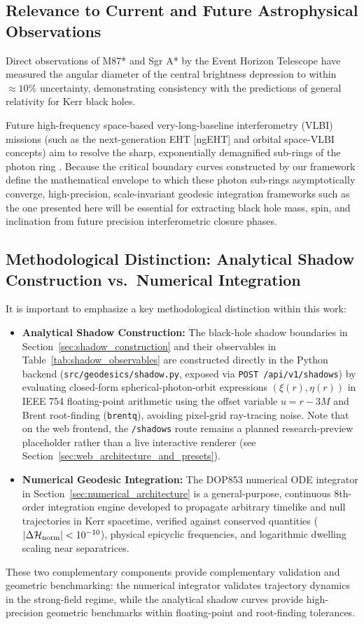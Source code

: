 \subsection{Relevance to Current and Future Astrophysical Observations}
Direct observations of M87* \cite{EHT2019_PaperI} and Sgr A* \cite{EHT2022_PaperI} by the Event Horizon Telescope have measured the angular diameter of the central brightness depression to within $\approx 10\%$ uncertainty, demonstrating consistency with the predictions of general relativity for Kerr black holes.

Future high-frequency space-based very-long-baseline interferometry (VLBI) missions (such as the next-generation EHT [ngEHT] and orbital space-VLBI concepts) aim to resolve the sharp, exponentially demagnified sub-rings of the photon ring \cite{Johnson2020,Chael2021,Gralla2020}. Because the critical boundary curves constructed by our framework define the mathematical envelope to which these photon sub-rings asymptotically converge, high-precision, scale-invariant geodesic integration frameworks such as the one presented here will be essential for extracting black hole mass, spin, and inclination from future precision interferometric closure phases.

\subsection{Methodological Distinction: Analytical Shadow Construction vs.\ Numerical Integration}
It is important to emphasize a key methodological distinction within this work:
\begin{itemize}
    \item \textbf{Analytical Shadow Construction:} The black-hole shadow boundaries in Section~\ref{sec:shadow_construction} and their observables in Table~\ref{tab:shadow_observables} are constructed directly in the Python backend (\texttt{src/\allowbreak geodesics/\allowbreak shadow.py}, exposed via \texttt{POST /api/\allowbreak v1/\allowbreak shadows}) by evaluating closed-form spherical-photon-orbit expressions $(\xi(r), \eta(r))$ in IEEE 754 floating-point arithmetic using the offset variable $u = r - 3M$ and Brent root-finding (\texttt{brentq}), avoiding pixel-grid ray-tracing noise. Note that on the web frontend, the \texttt{/shadows} route remains a planned research-preview placeholder rather than a live interactive renderer (see Section~\ref{sec:web_architecture_and_presets}).
    \item \textbf{Numerical Geodesic Integration:} The DOP853 numerical ODE integrator in Section~\ref{sec:numerical_architecture} is a general-purpose, continuous 8th-order integration engine developed to propagate arbitrary timelike and null trajectories in Kerr spacetime, verified against conserved quantities ($|\Delta\mathcal{H}_{\rm norm}| < 10^{-10}$), physical epicyclic frequencies, and logarithmic dwelling scaling near separatrices.
\end{itemize}
These two complementary components provide complementary validation and geometric benchmarking: the numerical integrator validates trajectory dynamics in the strong-field regime, while the analytical shadow curves provide high-precision geometric benchmarks within floating-point and root-finding tolerances.
